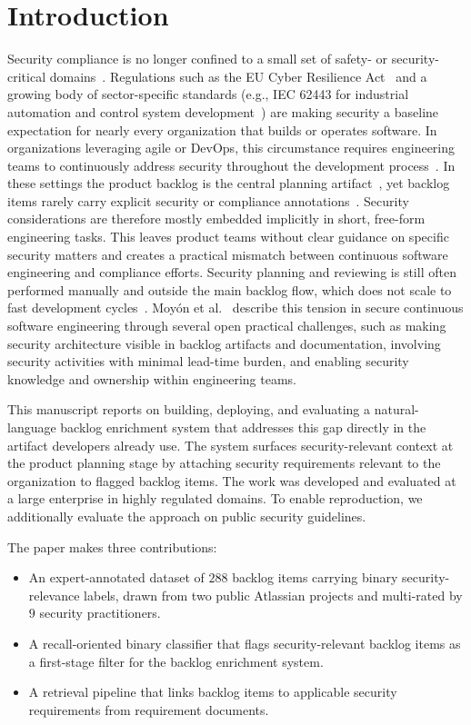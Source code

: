 \section{Introduction}

Security compliance is no longer confined to a small set of safety- or security-critical domains~\cite{moyon2020security-compliance-agile}.
Regulations such as the EU Cyber Resilience Act~\cite{eu2024cra} and a growing body of sector-specific standards (e.g., IEC 62443 for industrial automation and control system development~\cite{iec2018secure}) are making security a baseline expectation for nearly every organization that builds or operates software.
In organizations leveraging agile or DevOps, this circumstance requires engineering teams to continuously address security throughout the development process~\cite{fitzgerald2017continuous, turpe2017scrum}.
In these settings the product backlog is the central planning artifact~\cite{iso2018sse, ferreira2022writing-agile-requirements}, yet backlog items rarely carry explicit security or compliance annotations~\cite{turpe2017scrum}.
Security considerations are therefore mostly embedded implicitly in short, free-form engineering tasks. This leaves product teams without clear guidance on specific security matters and creates a practical mismatch between continuous software engineering and compliance efforts.
Security planning and reviewing is still often performed manually and outside the main backlog flow, which does not scale to fast development cycles~\cite{moyon2020security-compliance-agile}.
Moyón et al.~\cite{moyon2024challenges} describe this tension in secure continuous software engineering through several open practical challenges, such as making security architecture visible in backlog artifacts and documentation, involving security activities with minimal lead-time burden, and enabling security knowledge and ownership within engineering teams.


This manuscript reports on building, deploying, and evaluating a natural-language backlog enrichment system that addresses this gap directly in the artifact developers already use.
The system surfaces security-relevant context at the product planning stage by attaching security requirements relevant to the organization to flagged backlog items.
The work was developed and evaluated at a large enterprise in highly regulated domains. To enable reproduction, we additionally evaluate the approach on public security guidelines.

The paper makes three contributions:
\begin{itemize}
    \item[\textbf{C1}] An expert-annotated dataset of $288$ backlog items carrying binary security-relevance labels, drawn from two public Atlassian projects and multi-rated by $9$ security practitioners.
    \item[\textbf{C2}] A recall-oriented binary classifier that flags security-relevant backlog items as a first-stage filter for the backlog enrichment system.
    \item[\textbf{C3}] A retrieval pipeline that links backlog items to applicable security requirements from requirement documents.
\end{itemize}

